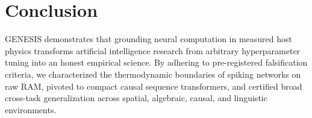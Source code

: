 \documentclass[10pt,journal,compsoc]{IEEEtran}
\begin{document}
\section{Conclusion}
GENESIS demonstrates that grounding neural computation in measured host physics transforms artificial intelligence research from arbitrary hyperparameter tuning into an honest empirical science. By adhering to pre-registered falsification criteria, we characterized the thermodynamic boundaries of spiking networks on raw RAM, pivoted to compact causal sequence transformers, and certified broad cross-task generalization across spatial, algebraic, causal, and linguistic environments.



\end{document}
